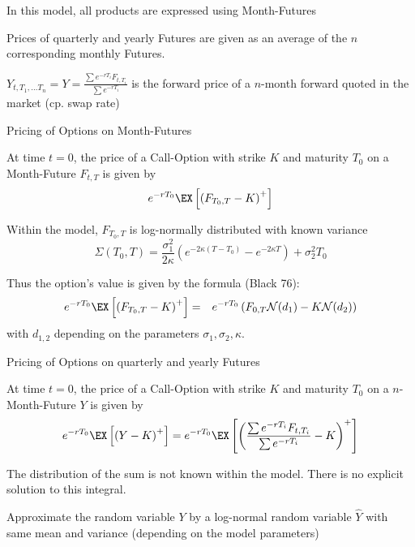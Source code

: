 



	In this model, all products are expressed using Month-Futures


	Prices of quarterly and yearly Futures are given as an
average of the  $n$ corresponding monthly Futures.


	$Y_{t,T_1, \ldots T_n}=Y=\frac{\sum e^{-rT_i}F_{t,T_i}}{\sum e^{-rT_i}}$
is the forward price of a $n$-month forward quoted in the market (cp. swap rate)






{Pricing of Options on Month-Futures}






	At time $t=0$, the price of a  Call-Option with strike $K$ and maturity $T_0$ on a Month-Future $F_{t,T}$ is given by
$$e^{-rT_0}\EX\left[\left(F_{T_0,T}-K\right)^+\right]$$


	Within the model,  $F_{T_0,T}$ is log-normally distributed with known variance
$$
\Sigma(T_0,T) =   \frac{\sigma_1^2}{2\kappa}(e^{-2\kappa (T-T_0)}-e^{-2\kappa T})+\sigma_2^2T_0
$$


	Thus the option's value is given by the formula (Black 76):
\begin{eqnarray*}
e^{-rT_0}\EX\left[\left(F_{T_0,T}-K\right)^+\right] & = &
e^{-rT_0}\left(F_{0,T}\mathcal{N}(d_1)-K\mathcal{N}(d_2)\right)
\end{eqnarray*}with $d_{1,2}$ depending on the parameters $\sigma_1, \sigma_2, \kappa$.






{Pricing of Options on quarterly and yearly Futures}






	At time $t=0$, the price of a  Call-Option with strike $K$ and maturity $T_0$ on a $n$-Month-Future
$Y$ is given by
$$
e^{-rT_0}\EX\left[\left(Y-K\right)^+\right]=e^{-rT_0}\EX
\left[\left(\frac{\sum e^{-rT_i}F_{t,T_i}}{\sum e^{-rT_i}}-K\right)^+\right]$$


	The distribution of the sum is not known within the model. There is no explicit solution to this integral.


	Approximate the random variable $Y$ by a log-normal random variable $\hat{Y}$
with same mean and variance (depending on the model parameters)


